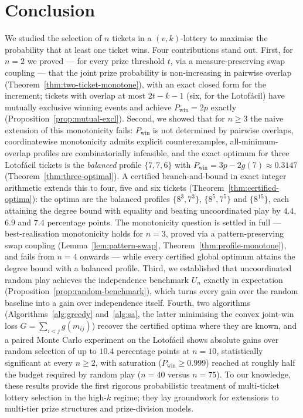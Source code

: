 \section{Conclusion}
\label{sec:conclusion}

We studied the selection of $n$ tickets in a $(v,k)$-lottery to maximise
the probability that at least one ticket wins.  Four contributions stand
out.  First, for $n=2$ we proved --- for every prize threshold $t$, via a
measure-preserving swap coupling --- that the joint prize probability is
non-increasing in pairwise overlap (Theorem~\ref{thm:two-ticket-monotone}),
with an exact closed form for the increment; tickets with overlap at most
$2t-k-1$ (six, for the Lotof\'{a}cil) have mutually exclusive winning
events and achieve $P_{\mathrm{win}} = 2p$ exactly
(Proposition~\ref{prop:mutual-excl}).  Second, we showed that for
$n \ge 3$ the naive extension of this monotonicity fails: $P_{\mathrm{win}}$
is not determined by pairwise overlaps, coordinatewise monotonicity admits
explicit counterexamples, all-minimum-overlap profiles are combinatorially
infeasible, and the exact optimum for three Lotof\'{a}cil tickets is the
\emph{balanced} profile $\{7,7,6\}$ with
$P_{\mathrm{win}} = 3p - 2g(7) \approx 0.3147$
(Theorem~\ref{thm:three-optimal}).  A certified branch-and-bound in exact
integer arithmetic extends this to four, five and six tickets
(Theorem~\ref{thm:certified-optima}): the optima are the balanced
profiles $\{8^3,7^3\}$, $\{8^5,7^5\}$ and $\{8^{15}\}$, each attaining
the degree bound with equality and beating uncoordinated play by $4.4$,
$6.9$ and $7.4$ percentage points.  The monotonicity question is settled
in full --- best-realisation monotonicity holds for $n = 3$, proved via a
pattern-preserving swap coupling (Lemma~\ref{lem:pattern-swap},
Theorem~\ref{thm:profile-monotone}), and fails from $n = 4$ onwards ---
while every certified global optimum attains the degree bound with a
balanced profile.  Third, we established that uncoordinated random play achieves the
independence benchmark $U_n$ exactly in expectation
(Proposition~\ref{prop:random-benchmark}), which turns every gain over the
random baseline into a gain over independence itself.  Fourth, two
algorithms (Algorithms~\ref{alg:greedy} and~\ref{alg:sa}, the latter
minimising the convex joint-win loss $G = \sum_{i<j} g(m_{ij})$) recover
the certified optima where they are known, and a paired Monte Carlo
experiment on the Lotof\'{a}cil shows absolute gains over random selection
of up to $10.4$ percentage points at $n = 10$, statistically significant
at every $n \ge 2$, with saturation ($P_{\mathrm{win}} \ge 0.999$) reached
at roughly half the budget required by random play ($n = 40$ versus
$n = 75$).  To our knowledge, these results provide the first rigorous
probabilistic treatment of multi-ticket lottery selection in the high-$k$
regime; they lay groundwork for extensions to multi-tier prize structures
and prize-division models.

